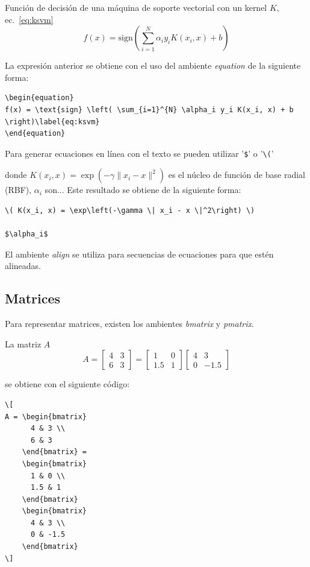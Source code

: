 \documentclass[12pt,letterpaper,spanish, twoside]{article}
\begin{document}
\ej Función de decisión de una máquina de soporte vectorial con un kernel $K$, ec.~\ref{eq:ksvm}
\begin{equation}
f(x) = \text{sign} \left( \sum_{i=1}^{N} \alpha_i y_i K(x_i, x) + b \right)\label{eq:ksvm}
\end{equation}

La expresión anterior se obtiene con el uso del ambiente \textit{equation} de la siguiente forma:
\begin{lstlisting}[caption={Ambiente equation}]
\begin{equation}
f(x) = \text{sign} \left( \sum_{i=1}^{N} \alpha_i y_i K(x_i, x) + b \right)\label{eq:ksvm}
\end{equation}
\end{lstlisting}

Para generar ecuaciones en línea con el texto se pueden utilizar '\verb|$|' o '\verb|\(|'

\ej donde \( K(x_i, x) = \exp\left(-\gamma \| x_i - x \|^2\right) \) es el núcleo de función de base radial (RBF),  $\alpha_i$ son... Este resultado se obtiene de la siguiente forma:
\begin{lstlisting}[caption={Ambientes de ecuaciones en línea y sin numeración}]
\( K(x_i, x) = \exp\left(-\gamma \| x_i - x \|^2\right) \)

$\alpha_i$
\end{lstlisting}

El ambiente \textit{align} se utiliza para secuencias de ecuaciones para que estén alineadas.

\subsection{Matrices}
Para representar matrices, existen los ambientes \textit{bmatrix} y \textit{pmatrix}.

\ej La matriz $A$ 
\[
A = \begin{bmatrix} 
      4 & 3 \\
      6 & 3
    \end{bmatrix} = 
    \begin{bmatrix} 
      1 & 0 \\ 
      1.5 & 1 
    \end{bmatrix}
    \begin{bmatrix}
      4 & 3 \\ 
      0 & -1.5
    \end{bmatrix}
\]

se obtiene con el siguiente código:
\begin{lstlisting}[caption={Representación de matrices}]
\[
A = \begin{bmatrix} 
      4 & 3 \\
      6 & 3
    \end{bmatrix} = 
    \begin{bmatrix} 
      1 & 0 \\ 
      1.5 & 1 
    \end{bmatrix}
    \begin{bmatrix}
      4 & 3 \\ 
      0 & -1.5
    \end{bmatrix}
\]
\end{lstlisting}
\end{document}
